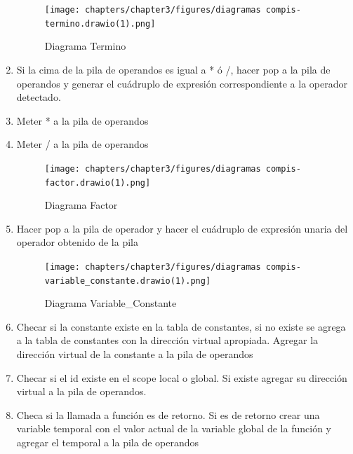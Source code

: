 \begin{enumerate}
    \begin{figure}[!htbp]
            \centering
            \texttt{[image: chapters/chapter3/figures/diagramas compis-termino.drawio(1).png]}
            \caption{Diagrama Termino}
            \label{fig:my_label}
    \end{figure}
    \FloatBarrier
    \item Si la cima de la pila de operandos es igual a * ó /, hacer pop a la pila de operandos y generar el cuádruplo de expresión correspondiente a la operador detectado.
    \item Meter * a la pila de operandos
    \item Meter / a la pila de operandos
    \newpage
    
    \begin{figure}[!htbp]
            \centering
            \texttt{[image: chapters/chapter3/figures/diagramas compis-factor.drawio(1).png]}
            \caption{Diagrama Factor}
            \label{fig:my_label}
    \end{figure}
    \FloatBarrier
    \item Hacer pop a la pila de operador y hacer el cuádruplo de expresión unaria del operador obtenido de la pila
    
    
    \newpage
    
    \begin{figure}[!htbp]
            \centering
            \texttt{[image: chapters/chapter3/figures/diagramas compis-variable\_constante.drawio(1).png]}
            \caption{Diagrama Variable\_Constante}
            \label{fig:my_label}
    \end{figure}
    \FloatBarrier
    \item Checar si la constante existe en la tabla de constantes, si no existe se agrega a la tabla de constantes con la dirección virtual apropiada. Agregar la dirección virtual de la constante a la pila de operandos
    \item Checar si el id existe en el scope local o global. Si existe agregar su dirección virtual a la pila de operandos.
    \item Checa si la llamada a función es de retorno. Si es de retorno crear una variable temporal con el valor actual de la variable global de la función y agregar el temporal a la pila de operandos
    
    
    \newpage
    

\end{enumerate}
